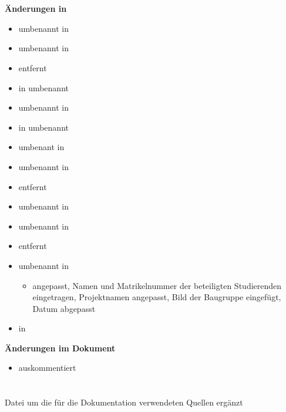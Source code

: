 \section{}
\textbf{Änderungen in }
\begin{itemize}
	\item {} umbenannt in 
	\item {} umbenannt in 
	\item {} entfernt
	\item {} in  umbenannt
	\item {} umbenannt in 
	\item {} in  umbenannt
	\item {} umbenant in 
	\item {} umbenannt in 
	\item {} entfernt
	\item {} umbenannt in 
	\item {} umbenannt in 
	\item {} entfernt
	\item {} umbenannt in 
	    \begin{itemize}
		\item {} angepasst, Namen und Matrikelnummer der beteiligten Studierenden eingetragen, Projektnamen angepasst, Bild der Baugruppe eingefügt, Datum abgepasst
    	\end{itemize}
	\item {} in 
\end{itemize}
\textbf{Änderungen im Dokument }
    \begin{itemize}
	\item {} auskommentiert
    \end{itemize}



\section{}
 Datei um die für die Dokumentation verwendeten Quellen ergänzt



